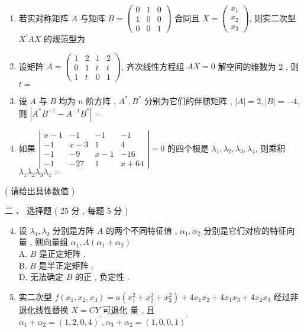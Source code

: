 \documentclass[10pt]{article}
\begin{document}
{\begin{enumerate}
  \item  若实对称矩阵  $A$  与矩阵  $B=\left(\begin{array}{lll}0 & 1 & 0 \\ 1 & 0 & 0 \\ 0 & 0 & 1\end{array}\right)$  合同且  $X=\left(\begin{array}{l}x_{1} \\ x_{2} \\ x_{3}\end{array}\right)$,  则实二次型  $X^{\prime} A X$  的规范型为 

  \item  设矩阵  $A=\left(\begin{array}{llll}1 & 2 & 1 & 2 \\ 0 & 1 & t & t \\ 1 & t & 0 & 1\end{array}\right)$,  齐次线性方程组  $A X=0$  解空间的维数为  2 ,  则  $t=$

  \item  设  $A$  与  $B$  均为  $n$  阶方阵 , $A^{*}, B^{*}$  分别为它们的伴随矩阵 , $|A|=2,|B|=-4$,  则  $\left|A^{*} B^{-1}-A^{-1} B^{*}\right|=$

  \item  如果  $\left|\begin{array}{cccc}x-1 & -1 & -1 & -1 \\ -1 & x-3 & 1 & 4 \\ -1 & -9 & x-1 & -16 \\ -1 & -27 & 1 & x+64\end{array}\right|=0$  的四个根是  $\lambda_{1}, \lambda_{2}, \lambda_{3}, \lambda_{4}$,  则乘积  $\lambda_{1} \lambda_{2} \lambda_{3} \lambda_{4}=$

\end{enumerate}
( 请给出具体数值 )

 二 、  选择题 ( 25  分 , 每题  5  分 )

\begin{enumerate}
  \setcounter{enumi}{3}
  \item  设  $\lambda_{1}, \lambda_{2}$  分别是方阵  $A$  的两个不同特征值 , $\alpha_{1}, \alpha_{2}$  分别是它们对应的特征向量 ,  则向量组  $\alpha_{1}, A\left(\alpha_{1}+\alpha_{2}\right)$\\
A. $B$  是正定矩阵 .\\
B. $B$  是半正定矩阵 .\\
D.  无法确定  $B$  的正 ,  负定性 .

  \item  实二次型  $f\left(x_{1}, x_{2}, x_{3}\right)=a\left(x_{1}^{2}+x_{2}^{2}+x_{3}^{2}\right)+4 x_{1} x_{2}+4 x_{1} x_{3}+4 x_{2} x_{3}$  经过非退化线性替换  $X=C Y$  可退化   量 ,  且  $\alpha_{1}+\alpha_{2}=(1,2,0,4)^{\prime}, \alpha_{3}+\alpha_{2}=(1,0,0,1)^{\prime}$


\end{enumerate}}
\end{document}
